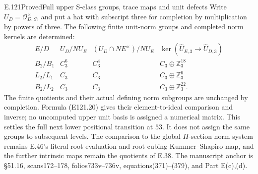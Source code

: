 \begin{statement}{E.121}{Proved}{Full upper S-class groups, trace maps and unit defects}
Write $U_D=\mathcal O_{D,S}^{\times}$, and put a hat with
subscript three for completion by multiplication by powers
of three. The following finite unit-norm groups and completed
norm kernels are determined:
\[
 \begin{array}{c|c|c|c}
 E/D&U_D/N U_E&
 (U_D\cap N E^\times)/N U_E&
 \ker(\widehat U_{E,3}\to\widehat U_{D,3})\\ \hline
 B_2/B_1&C_3^6&C_3^4&C_3\oplus\mathbb Z_3^{18}\\
 L_2/L_1&C_3&C_3&C_3\oplus\mathbb Z_3^6\\
 B_2/L_2&C_3&C_3&C_3\oplus\mathbb Z_3^{22}.
 \end{array}
 \tag{E121.9}
\]
The finite quotients and their actual defining norm subgroups
are unchanged by completion. Formula (E121.20) gives their
element-to-ideal comparison and inverse; no uncomputed upper
unit basis is assigned a numerical matrix.
This settles the full next lower positional transition at $53$.
It does not assign the same groups to subsequent levels.
The comparison to the global $H$-section norm system remains
E.46's literal root-evaluation and root-cubing Kummer--Shapiro
map, and the further intrinsic maps remain the quotients of
E.38. The manuscript anchor is \S51.16, scans172--178,
folios733v--736v, equations(371)--(379), and Part E(c),(d).
\end{statement}

